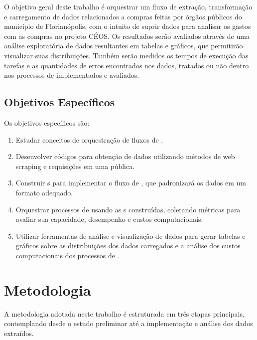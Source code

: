 \documentclass[
	12pt,				%
	oneside,			%
	a4paper,			%
	chapter=TITLE,		%
	section=TITLE,		%
	english,			%
	brazil				%
	]{abntex2}
\begin{document}
O objetivo geral deste trabalho é orquestrar um fluxo de extração, transformação e carregamento de dados relacionados a compras feitas por órgãos públicos do município de Florianópolis, com o intuito de suprir dados para  analisar os gastos com as compras no projeto CÉOS. Os resultados serão avaliados através de uma análise exploratória de dados resultantes em tabelas e gráficos, que permitirão visualizar suas distribuições. Também serão medidos os tempos de execução das tarefas e as quantidades de erros encontrados nos dados, tratados ou não dentro nos processos de  implementados e avaliados.

\subsection{Objetivos Específicos}

Os objetivos específicos são:
\begin{enumerate}
    \item Estudar conceitos de orquestração de fluxos de .
    \item Desenvolver códigos para obtenção de dados utilizando métodos de web scraping e requisições em uma  pública.
    \item Construir s para implementar o fluxo de , que padronizará os dados em um formato adequado.
    \item Orquestrar processos de  usando as s construídas, coletando métricas para avaliar sua capacidade, desempenho e custos computacionais.
    \item Utilizar ferramentas de análise e visualização de dados para gerar tabelas e gráficos sobre as distribuições dos dados carregados e a análise dos custos computacionais dos processos de .
\end{enumerate}

\section{Metodologia}

A metodologia adotada neste trabalho é estruturada em três etapas principais, contemplando desde o estudo preliminar até a implementação e análise dos dados extraídos.
\end{document}
